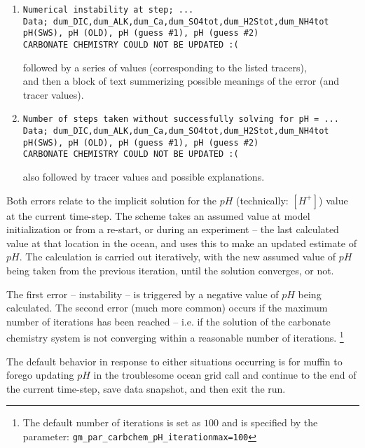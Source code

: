 \documentclass[11pt,fleqn]{book} %
\begin{document}
\begin{enumerate}[noitemsep]

\vspace{2mm}
\item 
\small\begin{verbatim}
Numerical instability at step; ...
Data; dum_DIC,dum_ALK,dum_Ca,dum_SO4tot,dum_H2Stot,dum_NH4tot
pH(SWS), pH (OLD), pH (guess #1), pH (guess #2)
CARBONATE CHEMISTRY COULD NOT BE UPDATED :(
\end{verbatim}\normalsize
followed by a series of values (corresponding to the listed tracers),
\\and then a block of text summerizing possible meanings of the error (and tracer values).

\vspace{2mm}
\item 
\small\begin{verbatim}
Number of steps taken without successfully solving for pH = ...
Data; dum_DIC,dum_ALK,dum_Ca,dum_SO4tot,dum_H2Stot,dum_NH4tot
pH(SWS), pH (OLD), pH (guess #1), pH (guess #2)
CARBONATE CHEMISTRY COULD NOT BE UPDATED :(
\end{verbatim}\normalsize
also followed by tracer values and possible explanations.
\end{enumerate}

\vspace{1mm}
\noindent Both errors relate to the implicit solution for the \(pH\) (technically: \([H^{+}]\)) value at the current time-step. The scheme takes an assumed value at model initialization or from a re-start, or during an experiment -- the last calculated value at that location in the ocean, and uses this to make an updated estimate of \(pH\). The calculation is carried out iteratively, with the new assumed value of \(pH\) being taken from the previous iteration, until the solution converges, or not.

The first error -- instability -- is triggered by a negative value of \(pH\) being calculated. The second error (much more common) occurs if the maximum number of iterations has been reached -- i.e. if the solution of the carbonate chemistry system is not converging within a reasonable number of iterations. \footnote{The default number of iterations is set as \(100\) and is specified by the parameter: \texttt{gm\_par\_carbchem\_pH\_iterationmax=100}}

The default behavior in response to either situations occurring is for muffin to forego updating \(pH\) in the troublesome ocean grid call and continue to the end of the current time-step, save data snapshot, and then exit the run.
\end{document}
